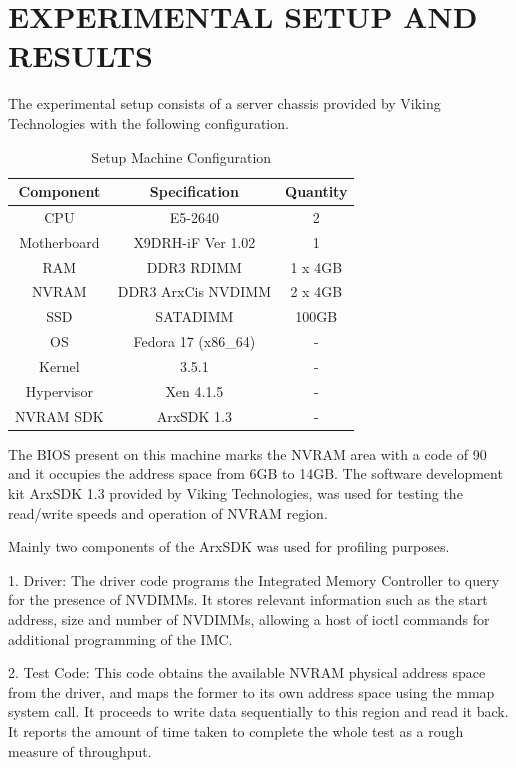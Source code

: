 

\chapter{\uppercase{Experimental Setup and Results}}

The experimental setup consists of a server chassis provided by Viking Technologies \cite{cit:Viking_webpage} with the following configuration. 


\begin{table}[H]
\centering
\caption{Setup Machine Configuration}
\label{tab:unixcomp}
\begin{tabular}{|c|c|c|}
    \hline
    Component & Specification & Quantity \\
    \hline
    \hline
    CPU & E5-2640 & 2                    \\
    \hline
    Motherboard & X9DRH-iF Ver 1.02 & 1  \\
    \hline
    RAM & DDR3 RDIMM & 1 x 4GB           \\
    \hline
    NVRAM & DDR3 ArxCis NVDIMM & 2 x 4GB \\
    \hline
    SSD & SATADIMM & 100GB               \\
    \hline
    OS & Fedora 17 (x86\_64) & -         \\
    \hline
    Kernel & 3.5.1 & -                   \\
    \hline
    Hypervisor & Xen 4.1.5 & -           \\
    \hline
    NVRAM SDK & ArxSDK 1.3 & -           \\
    \hline
\end{tabular}
\end{table}

The BIOS present on this machine marks the NVRAM area with a code of 90 and it occupies the address space from 6GB to 14GB. The software development kit ArxSDK 1.3 provided by Viking Technologies, was used for testing the read/write speeds and operation of NVRAM region.

Mainly two components of the ArxSDK was used for profiling purposes.

1. Driver: The driver code programs the Integrated Memory Controller to query for the presence of NVDIMMs. It stores relevant information such as the start address, size and number of NVDIMMs, allowing a host of ioctl commands for additional programming of the IMC.

2. Test Code: This code obtains the available NVRAM physical address space from the driver, and maps the former to its own address space using the mmap system call. It proceeds to write data sequentially to this region and read it back. It reports the amount of time taken to complete the whole test as a rough measure of throughput.

